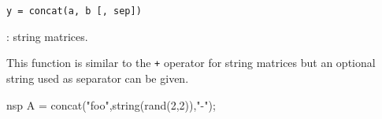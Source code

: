 
\begin{mandesc}
\end{mandesc}

\begin{calling_sequence}
\begin{verbatim}
y = concat(a, b [, sep])
\end{verbatim}
\end{calling_sequence}
\begin{parameters}
  \begin{varlist}
    : string matrices.
  \end{varlist}
\end{parameters}

\begin{mandescription}
  This function is similar to the \verb-+- operator for string 
  matrices but an optional string used as separator can be given.
\end{mandescription}
\begin{examples}
  \begin{mintednsp}{nsp}
    A = concat("foo",string(rand(2,2)),"-");
  \end{mintednsp}
\end{examples}

\begin{manseealso}
\end{manseealso}
